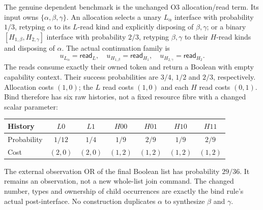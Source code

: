 \documentclass[11pt,a4paper]{article}
\theoremstyle{definition}
\begin{document}
The genuine dependent benchmark is the unchanged O3 allocation/read term.
Its input owns $\{\alpha,\beta,\gamma\}$. An allocation selects a unary
$L_\alpha$ interface with probability $1/3$, retyping $\alpha$ to its
$L$-read kind and explicitly disposing of $\beta,\gamma$; or a binary
$[H_{1,\beta},H_{2,\gamma}]$ interface with probability $2/3$, retyping
$\beta,\gamma$ to their $H$-read kinds and disposing of $\alpha$. The
actual continuation family is
\[
 u_{L_\alpha}=\mathsf{read}_L,
 \quad u_{H_{1,\beta}}=\mathsf{read}_{H_1},
 \quad u_{H_{2,\gamma}}=\mathsf{read}_{H_2}.
\]
The reads consume exactly their owned token and return a Boolean with
empty capability context. Their success probabilities are $3/4$, $1/2$
and $2/3$, respectively. Allocation costs $(1,0)$; the $L$ read costs
$(1,0)$ and each $H$ read costs $(0,1)$. Bind therefore has six raw
histories, not a fixed resource fibre with a changed scalar parameter:
\begin{center}
\begin{tabular}{@{}lcccccc@{}}
\toprule
History&$L0$&$L1$&$H00$&$H01$&$H10$&$H11$\\
\midrule
Probability&$1/12$&$1/4$&$1/9$&$2/9$&$1/9$&$2/9$\\
Cost&$(2,0)$&$(2,0)$&$(1,2)$&$(1,2)$&$(1,2)$&$(1,2)$\\
\bottomrule
\end{tabular}
\end{center}
The external observation OR of the final Boolean list has probability
$29/36$. It remains an observation, not a new whole-list join command.
The changed number, types and ownership of child occurrences are exactly
the bind rule's actual post-interface. No construction duplicates $\alpha$
to synthesize $\beta$ and $\gamma$.
\end{document}

